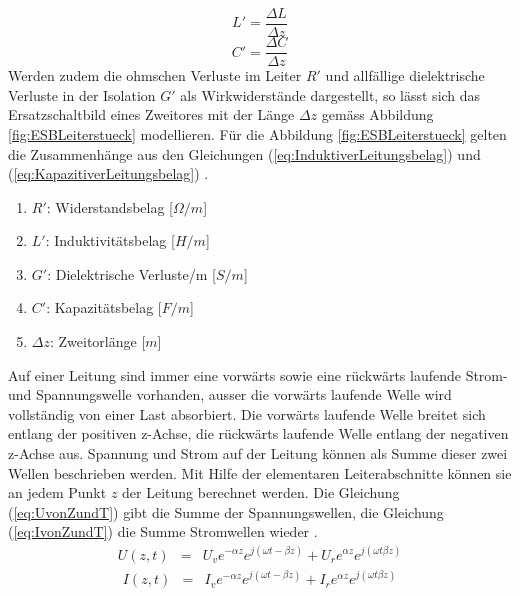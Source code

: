 \begin{equation}
L'=\dfrac{\Delta L}{\Delta z}\label{eq:InduktiverLeitungsbelag}
\end{equation}
\begin{equation}
C'=\dfrac{\Delta C}{\Delta z}\label{eq:KapazitiverLeitungsbelag}
\end{equation}
Werden zudem die ohmschen Verluste im Leiter $R'$ und allfällige dielektrische Verluste in der Isolation $G'$ als Wirkwiderstände dargestellt, so lässt sich das Ersatzschaltbild eines Zweitores mit der Länge $\Delta z$ gemäss Abbildung \ref{fig:ESBLeiterstueck} modellieren.
Für die Abbildung \ref{fig:ESBLeiterstueck} gelten die Zusammenhänge aus den Gleichungen (\ref{eq:InduktiverLeitungsbelag}) und  (\ref{eq:KapazitiverLeitungsbelag}) \cite{Tekom}.
\begin{enumerate}[leftmargin=2cm]
   \item[] $R'$: Widerstandsbelag [$\Omega/m$] 
   \item[] $L'$: Induktivitätsbelag  [$H/m$] 
   \item[] $G'$: Dielektrische Verluste/m  [$S/m$] 
   \item[] $C'$: Kapazitätsbelag [$F/m$] 
   \item[] $\Delta z$: Zweitorlänge [$m$] 
\end{enumerate} 
Auf einer Leitung sind immer eine vorwärts sowie  eine rückwärts laufende Strom- und Spannungswelle vorhanden, ausser die vorwärts laufende Welle wird vollständig von einer Last absorbiert. Die vorwärts laufende Welle breitet sich entlang der positiven z-Achse, die rückwärts laufende Welle entlang der negativen z-Achse aus. Spannung und Strom auf der Leitung können als Summe dieser zwei Wellen beschrieben werden. Mit Hilfe der elementaren Leiterabschnitte können sie an jedem Punkt $z$ der Leitung berechnet werden. Die Gleichung (\ref{eq:UvonZundT}) gibt die Summe der Spannungswellen, die Gleichung (\ref{eq:IvonZundT}) die Summe Stromwellen wieder \cite{Tekom}.
\begin{eqnarray}\label{eq:UvonZundT}
U(z,t) &=& U_{v}e^{-\alpha z}e^{j(\omega t -\beta z)}+U_{r}e^{\alpha z}e^{j(\omega t \beta z)}
\end{eqnarray}
\begin{eqnarray}\label{eq:IvonZundT}
I(z,t) &=& I_{v}e^{-\alpha z}e^{j(\omega t -\beta z)}+I_{r}e^{\alpha z}e^{j(\omega t \beta z)}
\end{eqnarray}

